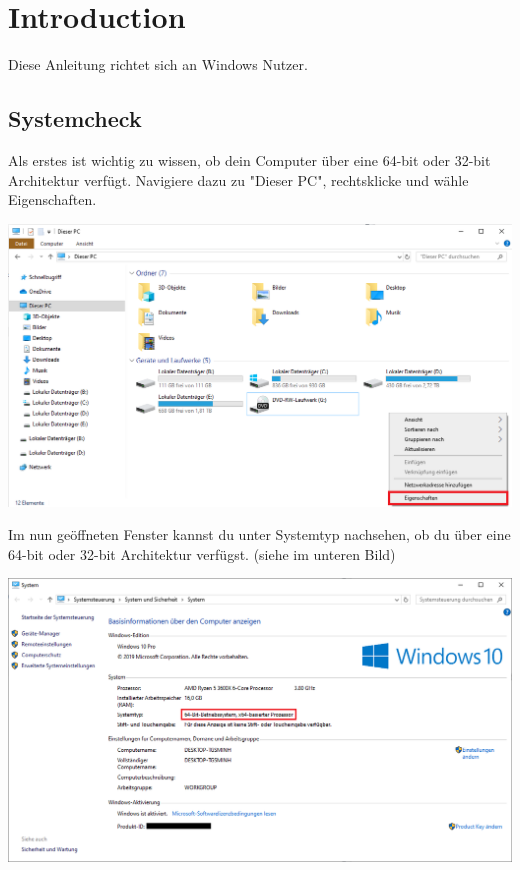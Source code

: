 \documentclass{scrartcl}
\begin{document}
\section{Introduction}
Diese Anleitung richtet sich an Windows Nutzer.

\subsection{Systemcheck}
Als erstes ist wichtig zu wissen, ob dein Computer über eine 64-bit oder 32-bit Architektur verfügt. Navigiere dazu zu "Dieser PC", rechtsklicke und wähle Eigenschaften.

\begin{center}
    \includegraphics[width=.8\textwidth]{Screenshot_1.png}
\end{center}

Im nun geöffneten Fenster kannst du unter Systemtyp nachsehen, ob du über eine 64-bit oder 32-bit Architektur verfügst.
(siehe im unteren Bild)

\begin{center}
    \includegraphics[width=.9\textwidth]{Screenshot_2.png}
\end{center}
\end{document}
